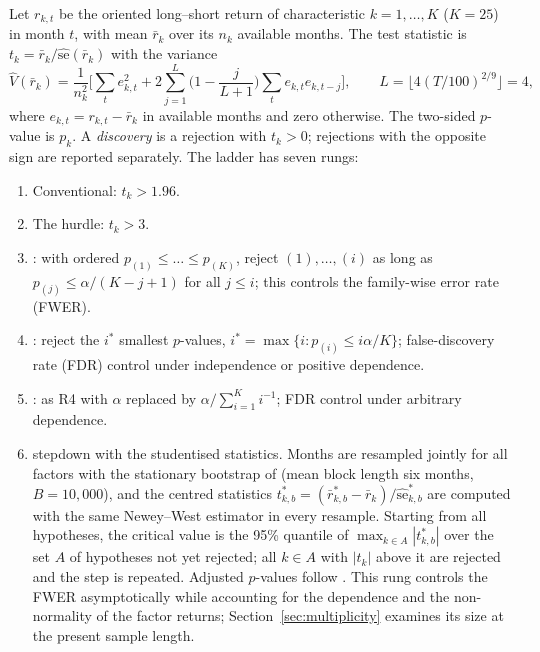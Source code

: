 \documentclass[11pt]{article}
\begin{document}
Let $r_{k,t}$ be the oriented long--short return of characteristic $k=1,\dots,K$ ($K=25$) in month $t$, with mean
$\bar r_k$ over its $n_k$ available months. The test statistic is $t_k=\bar r_k/\widehat{\mathrm{se}}(\bar r_k)$
with the \citet{newey1987simple} variance
\begin{equation}
\widehat{V}(\bar r_k)=\frac{1}{n_k^{2}}\Big[\sum_t e_{k,t}^2+2\sum_{j=1}^{L}\Big(1-\frac{j}{L+1}\Big)\sum_{t}e_{k,t}e_{k,t-j}\Big],
\qquad L=\lfloor 4(T/100)^{2/9}\rfloor=4,
\end{equation}
where $e_{k,t}=r_{k,t}-\bar r_k$ in available months and zero otherwise. The two-sided $p$-value is $p_k$. A
\emph{discovery} is a rejection with $t_k>0$; rejections with the opposite sign are reported separately. The ladder has
seven rungs:
\begin{enumerate}[label=R\arabic*.]
\item Conventional: $t_k>1.96$.
\item The \citet{harvey2016cross} hurdle: $t_k>3$.
\item \citet{holm1979simple}: with ordered $p_{(1)}\le\dots\le p_{(K)}$, reject $(1),\dots,(i)$ as long as
$p_{(j)}\le\alpha/(K-j+1)$ for all $j\le i$; this controls the family-wise error rate (FWER).
\item \citet{benjamini1995controlling}: reject the $i^\ast$ smallest $p$-values, $i^\ast=\max\{i:p_{(i)}\le i\alpha/K\}$;
false-discovery rate (FDR) control under independence or positive dependence.
\item \citet{benjamini2001control}: as R4 with $\alpha$ replaced by $\alpha/\sum_{i=1}^{K}i^{-1}$; FDR control under
arbitrary dependence.
\item \citet{romano2005stepwise} stepdown with the studentised statistics. Months are resampled jointly for all factors
with the stationary bootstrap of \citet{politis1994stationary} (mean block length six months, $B=10{,}000$), and the
centred statistics $t^\ast_{k,b}=(\bar r^\ast_{k,b}-\bar r_k)/\widehat{\mathrm{se}}^\ast_{k,b}$ are computed with the
same Newey--West estimator in every resample. Starting from all hypotheses, the critical value is the 95\% quantile of
$\max_{k\in A}|t^\ast_{k,b}|$ over the set $A$ of hypotheses not yet rejected; all $k\in A$ with $|t_k|$ above it are
rejected and the step is repeated. Adjusted $p$-values follow \citet{romano2016efficient}. This rung controls the FWER
asymptotically while accounting for the dependence and the non-normality of the factor returns;
Section~\ref{sec:multiplicity} examines its size at the present sample length.

\end{enumerate}
\end{document}
